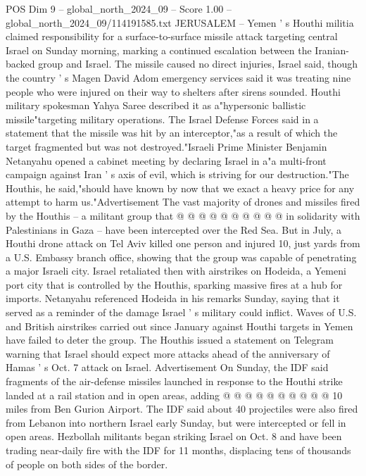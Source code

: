 \begin{textsample}{POS Dim 9 – global\_north\_2024\_09 – Score 1.00 – global\_north\_2024\_09/114191585.txt}  \label{ex:f9_pos_249}
JERUSALEM -- Yemen ' s Houthi militia claimed responsibility for a surface-to-surface missile attack targeting central Israel on Sunday morning, marking a continued escalation between the Iranian-backed group and Israel.
The missile caused no direct injuries, Israel said, though the country ' s Magen David Adom emergency services said it was treating nine people who were injured on their way to shelters after sirens sounded.
Houthi military spokesman Yahya Saree described it as a"hypersonic ballistic missile"targeting military operations.
The Israel Defense Forces said in a statement that the missile was hit by an interceptor,"as a result of which the target fragmented but was not destroyed."Israeli Prime Minister Benjamin Netanyahu opened a cabinet meeting by declaring Israel in a"a multi-front campaign against Iran ' s axis of evil, which is striving for our destruction."The Houthis, he said,"should have known by now that we exact a heavy price for any attempt to harm us."Advertisement The vast majority of drones and missiles fired by the Houthis -- a militant group that @ @ @ @ @ @ @ @ @ @ in solidarity with Palestinians in Gaza -- have been intercepted over the Red Sea.
But in July, a Houthi drone attack on Tel Aviv killed one person and injured 10, just yards from a U.S.
Embassy branch office, showing that the group was capable of penetrating a major Israeli city.
Israel retaliated then with airstrikes on Hodeida, a Yemeni port city that is controlled by the Houthis, sparking massive fires at a hub for imports.
Netanyahu referenced Hodeida in his remarks Sunday, saying that it served as a reminder of the damage Israel ' s military could inflict.
Waves of U.S. and British airstrikes carried out since January against Houthi targets in Yemen have failed to deter the group.
The Houthis issued a statement on Telegram warning that Israel should expect more attacks ahead of the anniversary of Hamas ' s Oct. 7 attack on Israel.
Advertisement On Sunday, the IDF said fragments of the air-defense missiles launched in response to the Houthi strike landed at a rail station and in open areas, adding @ @ @ @ @ @ @ @ @ @ 10 miles from Ben Gurion Airport.
The IDF said about 40 projectiles were also fired from Lebanon into northern Israel early Sunday, but were intercepted or fell in open areas.
Hezbollah militants began striking Israel on Oct. 8 and have been trading near-daily fire with the IDF for 11 months, displacing tens of thousands of people on both sides of the border.

\end{textsample}
